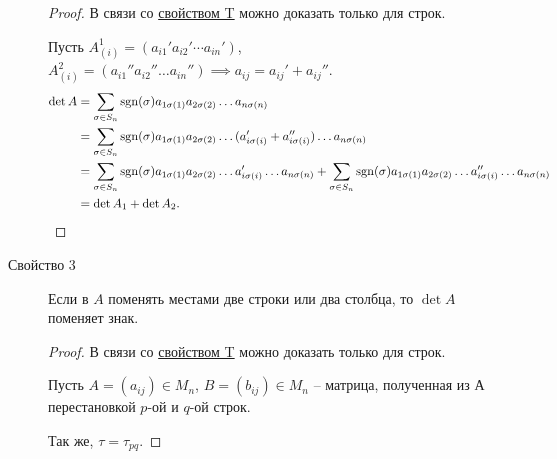 \begin{description}
    \begin{proof}
        В связи со \hyperref[det:prop_t]{свойством T} можно доказать только для строк.

        Пусть $A_{(i)}^1 = (a_{i1}' a_{i2}' \cdots a_{in}')$, $A_{(i)}^2 = (a_{i1}'' a_{i2}'' \dots a_{in}'') \implies a_{ij} = a_{ij}' + a_{ij}''$.
        \begin{align*}
            \det A
            &= \sum_{\sigma \in S_n} \operatorname{\mathop{\mathrm{sgn}}}(\sigma) a_{1\sigma(1)} a_{2\sigma(2)} \dots a_{n\sigma(n)} \\
            &= \sum_{\sigma \in S_n} \operatorname{\mathop{\mathrm{sgn}}}(\sigma) a_{1\sigma(1)} a_{2\sigma(2)} \dots (a'_{i\sigma(i)} + a''_{i\sigma(i)}) \dots a_{n \sigma(n)} \\
            &= \sum_{\sigma \in S_n} \operatorname{\mathop{\mathrm{sgn}}}(\sigma) a_{1\sigma(1)} a_{2\sigma(2)} \dots a'_{i\sigma(i)} \dots a_{n\sigma(n)} + \sum_{\sigma \in S_n} \operatorname{\mathop{\mathrm{sgn}}}(\sigma) a_{1\sigma(1)} a_{2\sigma(2)} \dots a''_{i\sigma(i)} \dots a_{n\sigma(n)} \\
            &= \det A_1 + \det A_2
        .\qedhere\end{align*}
    \end{proof}

\item[Свойство 3\label{det:prop_3}]
    Если в $A$ поменять местами две строки или два столбца, то $\det A$ поменяет знак.

    \begin{proof}
        В связи со \hyperref[det:prop_t]{свойством T} можно доказать только для строк.

        Пусть $A = (a_{ij}) \in M_n$, $B = (b_{ij}) \in M_n $ -- матрица, полученная из А перестановкой $p$-ой и $q$-ой строк.

        Так же, $\tau = \tau_{pq}$.


\end{proof}
\end{description}
